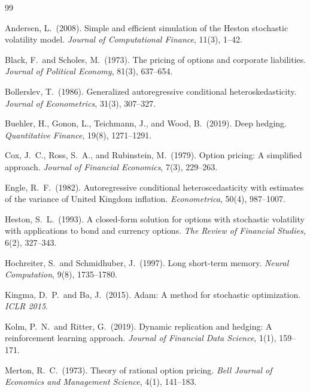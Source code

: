 \documentclass[12pt,a4paper]{article}
\begin{document}
\newpage

\begin{thebibliography}{99}

Andersen, L.\ (2008).
Simple and efficient simulation of the Heston stochastic volatility model.
\textit{Journal of Computational Finance}, 11(3), 1--42.

Black, F.\ and Scholes, M.\ (1973).
The pricing of options and corporate liabilities.
\textit{Journal of Political Economy}, 81(3), 637--654.

Bollerslev, T.\ (1986).
Generalized autoregressive conditional heteroskedasticity.
\textit{Journal of Econometrics}, 31(3), 307--327.

Buehler, H., Gonon, L., Teichmann, J., and Wood, B.\ (2019).
Deep hedging.
\textit{Quantitative Finance}, 19(8), 1271--1291.

Cox, J.\ C., Ross, S.\ A., and Rubinstein, M.\ (1979).
Option pricing: A simplified approach.
\textit{Journal of Financial Economics}, 7(3), 229--263.

Engle, R.\ F.\ (1982).
Autoregressive conditional heteroscedasticity with estimates of the variance
of United Kingdom inflation.
\textit{Econometrica}, 50(4), 987--1007.

Heston, S.\ L.\ (1993).
A closed-form solution for options with stochastic volatility with applications
to bond and currency options.
\textit{The Review of Financial Studies}, 6(2), 327--343.

Hochreiter, S.\ and Schmidhuber, J.\ (1997).
Long short-term memory.
\textit{Neural Computation}, 9(8), 1735--1780.

Kingma, D.\ P.\ and Ba, J.\ (2015).
Adam: A method for stochastic optimization.
\textit{ICLR 2015}.

Kolm, P.\ N.\ and Ritter, G.\ (2019).
Dynamic replication and hedging: A reinforcement learning approach.
\textit{Journal of Financial Data Science}, 1(1), 159--171.

Merton, R.\ C.\ (1973).
Theory of rational option pricing.
\textit{Bell Journal of Economics and Management Science}, 4(1), 141--183.


\end{thebibliography}
\end{document}
